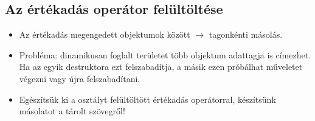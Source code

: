 \documentclass[usenames,dvipsnames,aspectratio=169]{beamer}
\begin{document}
\subsection{Az értékadás operátor felültöltése}

\begin{frame}
    \begin{itemize}
        \item Az értékadás megengedett objektumok között $\to$ tagonkénti másolás.
        \item Probléma: dinamikusan foglalt területet több objektum adattagja is címezhet. Ha az egyik destruktora ezt felszabadítja, a másik ezen próbálhat műveletet végezni vagy újra felszabadítani.
        \item Egészítsük ki a  osztályt felültöltött értékadás operátorral, készítsünk másolatot a tárolt szövegről!
    \end{itemize}
\end{frame}

\begin{frame}
    \begin{exampleblock}{}
        \footnotesize
        
    \end{exampleblock}
\end{frame}

\begin{frame}
    \begin{exampleblock}{}
        \scriptsize
        
    \end{exampleblock}
\end{frame}

\begin{frame}
    \begin{exampleblock}{}
        \small
        
    \end{exampleblock}
\end{frame}
\end{document}
